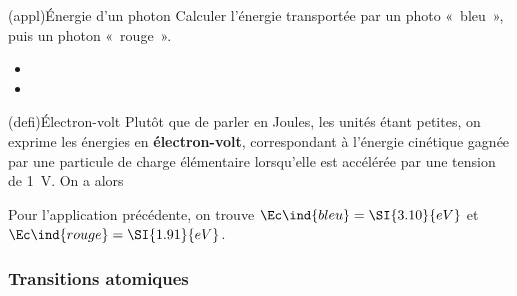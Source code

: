 \documentclass[../../main/main.tex]{subfiles}
\begin{document}
\begin{tcb}(appl){Énergie d'un photon}
	Calculer l'énergie transportée par un photo «~bleu~», puis un photon
	«~rouge~».
	\tcblower
	\begin{itemize}
		\item {}%
		\item {}%
	\end{itemize}
\end{tcb}

\begin{tcb}(defi){Électron-volt}
	Plutôt que de parler en Joules, les unités étant petites, on exprime les
	énergies en \textbf{électron-volt}, correspondant à l'énergie cinétique gagnée
	par une particule de charge élémentaire lorsqu'elle est accélérée par une
	tension de \SI{1}{V}. On a alors
	\psw{%
		\[
			\SI{1}{eV} = \SI{1.602e-19}{J}
		\]
	}%
	\vspace{-15pt}
\end{tcb}

Pour l'application précédente, on trouve $\Ec\ind{bleu} = \SI{3.10}{eV}$
et $\Ec\ind{rouge} = \SI{1.91}{eV}$.

\subsubsection{Transitions atomiques}
\label{sssec:transatom}
\end{document}
